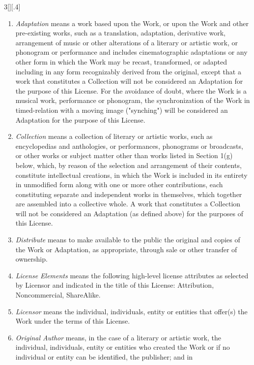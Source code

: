 \documentclass[8pt,a4paper]{article}
\begin{document}
\begin{multicols}{3}[][.4\paperwidth]
\begin{enumerate}
\begin{enumerate}
  \item \emph{Adaptation} means a work based upon the Work, or upon the Work
        and other pre-existing works, such as a translation, adaptation,
        derivative work, arrangement of music or other alterations of a
        literary or artistic work, or phonogram or performance and includes
        cinematographic adaptations or any other form in which the Work may be
        recast, transformed, or adapted including in any form recognizably
        derived from the original, except that a work that constitutes a
        Collection will not be considered an Adaptation for the purpose of
        this License. For the avoidance of doubt, where the Work is a musical
        work, performance or phonogram, the synchronization of the Work in
        timed-relation with a moving image ("synching") will be considered an
        Adaptation for the purpose of this License.
  \item \emph{Collection} means a collection of literary or artistic works,
        such as encyclopedias and anthologies, or performances, phonograms or
        broadcasts, or other works or subject matter other than works listed
        in Section 1(g) below, which, by reason of the selection and
        arrangement of their contents, constitute intellectual creations, in
        which the Work is included in its entirety in unmodified form along
        with one or more other contributions, each constituting separate and
        independent works in themselves, which together are assembled into a
        collective whole. A work that constitutes a Collection will not be
        considered an Adaptation (as defined above) for the purposes of this
        License.
  \item \emph{Distribute} means to make available to the public the original and
        copies of the Work or Adaptation, as appropriate, through sale or
        other transfer of ownership.
  \item \emph{License Elements} means the following high-level license attributes
        as selected by Licensor and indicated in the title of this License:
        Attribution, Noncommercial, ShareAlike.
  \item \emph{Licensor} means the individual, individuals, entity or entities that
        offer(s) the Work under the terms of this License.
  \item \emph{Original Author} means, in the case of a literary or artistic work,
        the individual, individuals, entity or entities who created the Work
        or if no individual or entity can be identified, the publisher; and in

\end{enumerate}
\end{enumerate}
\end{multicols}
\end{document}
